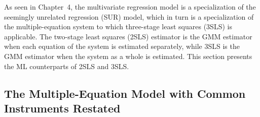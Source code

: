 
As seen in Chapter~4, the multivariate regression model is a specialization of the
seemingly unrelated regression (SUR) model, which in turn is a specialization of
the multiple-equation system to which three-stage least squares (3SLS) is applicable. The two-stage least squares (2SLS) estimator is the GMM estimator when
each equation of the system is estimated separately, while 3SLS is the GMM estimator when the system as a whole is estimated. This section presents the ML
counterparts of 2SLS and 3SLS.

\subsection*{The Multiple-Equation Model with Common Instruments Restated}

